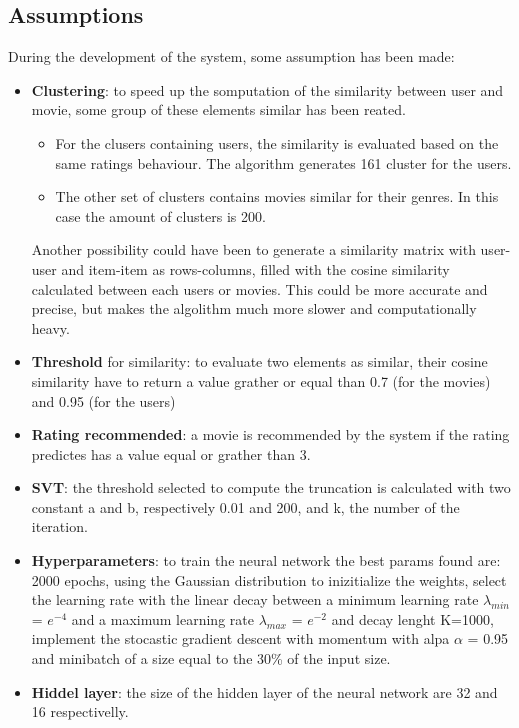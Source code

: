 \documentclass{article}
\begin{document}
\subsection{Assumptions}
During the development of the system, some assumption has been made:
\begin{itemize}
      \item \textbf{Clustering}: to speed up the somputation of the similarity between user and movie, some group of these elements similar has been reated.
      \begin{itemize}
            \item For the clusers containing users, the similarity is evaluated based on the same ratings behaviour. The algorithm generates 161 cluster for the users. 
            \item The other set of clusters contains movies similar for their genres. In this case the amount of clusters is 200.
      \end{itemize} 
      Another possibility could have been to generate a similarity matrix with user-user and item-item as rows-columns, filled with the cosine similarity calculated between each users or movies. This could be more accurate and precise, but makes the algolithm much more slower and computationally heavy.
      \item \textbf{Threshold} for similarity: to evaluate two elements as similar, their cosine similarity have to return a value grather or equal than 0.7 (for the movies) and 0.95 (for the users)
      \item \textbf{Rating recommended}: a movie is recommended by the system if the rating predictes has a value equal or grather than 3.
      \item \textbf{SVT}: the threshold selected to compute the truncation is calculated with two constant a and b, respectively 0.01 and 200, and k, the number of the iteration.
      \item \textbf{Hyperparameters}: to train the neural network the best params found are:
      2000 epochs, using the Gaussian distribution to inizitialize the weights, select the learning rate with the linear decay between a minimum learning rate ${\lambda_{min}}$ = ${e^{-4}}$ and a maximum learning rate ${\lambda_{max}}$ = ${e^{-2}}$ and decay lenght K=1000, implement the stocastic gradient descent with momentum with alpa ${\alpha}$ = 0.95 and minibatch of a size equal to the 30\% of the input size. 
      \item \textbf{Hiddel layer}: the size of the hidden layer of the neural network are 32 and 16 respectivelly.
\end{itemize}
\end{document}
